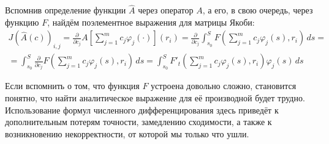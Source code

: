 \documentclass[a4paper,14pt]{extarticle}
\begin{document}
    Вспомнив определение функции $\hat{A}$ через оператор $A$, а его, в свою очередь, через функцию $F$, найдём поэлементное выражения для матрицы Якоби:
    \begin{gather*}
        J(\hat{A}(c))_{i, j}
        = \frac{\partial}{\partial c_j}
        A\left[
            \sum_{j = 1}^m c_j \varphi_j(\cdot)
            \right] (r_i)
        = \frac{\partial}{\partial c_j} \int_{s_0}^{S}
        F
        \left(
        \sum_{j = 1}^m c_j \varphi_j(s)
        , r_i
        \right) \, ds = \\
        = \int_{s_0}^{S}
        \frac{\partial}{\partial c_j}
        F
        \left(
        \sum_{j = 1}^m c_j \varphi_j(s)
        , r_i
        \right) \, ds
        = \int_{s_0}^{S}
        F'_t
        \left(
        \sum_{j = 1}^m c_j \varphi_j(s)
        , r_i
        \right)
        \varphi_j(s)
        \, ds
    \end{gather*}

    Если вспомнить о том, что функция $F$ устроена довольно сложно, становится понятно, что найти аналитическое выражение для её производной будет трудно. Использование формул численного дифференцирования здесь приведёт к дополнительным потерям точности, замедлению сходимости, а также к возникновению некорректности, от которой мы только что ушли.
\end{document}
